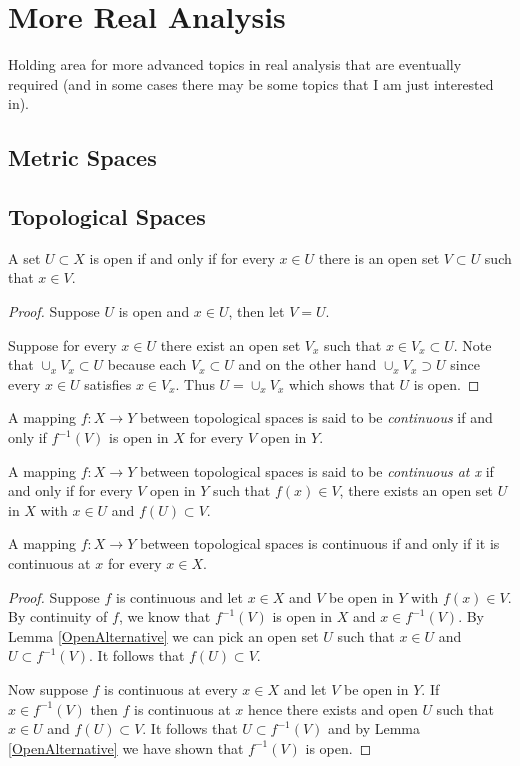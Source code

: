 \chapter{More Real Analysis}
Holding area for more advanced topics in real analysis that are
eventually required (and in some cases there may be some topics that I
am just interested in).
\section{Metric Spaces}

\section{Topological Spaces}
\begin{lem}\label{OpenAlternative}A set $U \subset X$ is open if and only if for every $x \in
  U$ there is an open set $V \subset U$ such that $x \in V$.
\end{lem}
\begin{proof}
Suppose $U$ is open and $x \in U$, then let $V = U$.

Suppose for every $x \in U$ there exist an open set $V_x$ such that $x
\in V_x \subset U$.  Note that $\cup_x V_x \subset U$ because each
$V_x \subset U$ and on the other hand $\cup_x V_x \supset U$ since
every $x \in U$ satisfies $x \in V_x$.  Thus $U = \cup_x V_x$ which
shows that $U$ is open.
\end{proof}
\begin{defn}A mapping $f : X \to Y$ between topological spaces is said
  to be \emph{continuous} if and only if $f^{-1}(V)$ is open in $X$
  for every $V$ open in $Y$.
\end{defn}
\begin{defn}A mapping $f : X \to Y$ between topological spaces is said
  to be \emph{continuous at x} if and only if for every $V$ open in
  $Y$ such that $f(x) \in V$, there exists an open set $U$ in $X$ with $x \in U$ and $f(U)
  \subset V$.
\end{defn}
\begin{lem}A mapping $f : X \to Y$ between topological spaces is
  continuous if and only if it is continuous at $x$ for every $x \in X$.
\end{lem}
\begin{proof}
Suppose $f$ is continuous and let $x \in X$ and $V$ be open in $Y$
with $f(x) \in V$.  By continuity of $f$, we know that $f^{-1}(V)$ is
open in $X$ and $x \in f^{-1}(V)$.  By Lemma \ref{OpenAlternative} we
can pick an open set $U$ such that $x \in U$ and $U \subset
f^{-1}(V)$.  It follows that $f(U) \subset V$.

Now suppose $f$ is continuous at every $x \in X$ and let $V$ be open
in $Y$.  If $x \in f^{-1}(V)$ then $f$ is continuous at $x$ hence
there exists and open $U$ such that $x \in U$ and $f(U) \subset V$.
It follows that $U \subset f^{-1}(V)$ and by Lemma
\ref{OpenAlternative}  we have shown that $f^{-1}(V)$ is open.
\end{proof}

